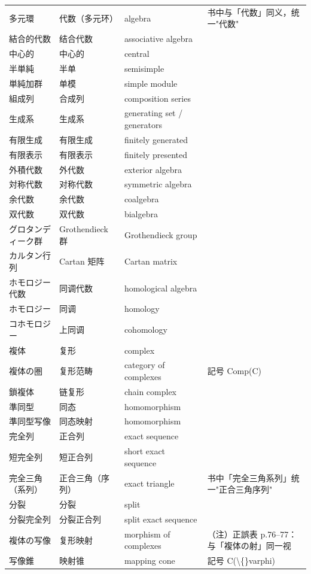 \begin{longtable}{p{}p{}p{}p{}}
多元環 & 代数（多元环） & algebra & 书中与「代数」同义，统一"代数" \\
結合的代数 & 结合代数 & associative algebra &  \\
中心的 & 中心的 & central &  \\
半単純 & 半单 & semisimple &  \\
単純加群 & 单模 & simple module &  \\
組成列 & 合成列 & composition series &  \\
生成系 & 生成系 & generating set / generators &  \\
有限生成 & 有限生成 & finitely generated &  \\
有限表示 & 有限表示 & finitely presented &  \\
外積代数 & 外代数 & exterior algebra &  \\
対称代数 & 对称代数 & symmetric algebra &  \\
余代数 & 余代数 & coalgebra &  \\
双代数 & 双代数 & bialgebra &  \\
グロタンディーク群 & Grothendieck 群 & Grothendieck group &  \\
カルタン行列 & Cartan 矩阵 & Cartan matrix &  \\
ホモロジー代数 & 同调代数 & homological algebra &  \\
ホモロジー & 同调 & homology &  \\
コホモロジー & 上同调 & cohomology &  \\
複体 & 复形 & complex &  \\
複体の圏 & 复形范畴 & category of complexes & 記号 Comp(C) \\
鎖複体 & 链复形 & chain complex &  \\
準同型 & 同态 & homomorphism &  \\
準同型写像 & 同态映射 & homomorphism &  \\
完全列 & 正合列 & exact sequence &  \\
短完全列 & 短正合列 & short exact sequence &  \\
完全三角（系列） & 正合三角（序列） & exact triangle & 书中「完全三角系列」统一"正合三角序列" \\
分裂 & 分裂 & split &  \\
分裂完全列 & 分裂正合列 & split exact sequence &  \\
複体の写像 & 复形映射 & morphism of complexes & （注）正誤表 p.76–77：与「複体の射」同一视 \\
写像錐 & 映射锥 & mapping cone & 記号 C(\textbackslash\{\}varphi) \\

\end{longtable}
